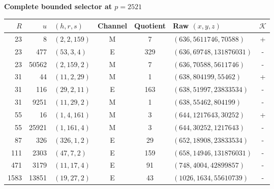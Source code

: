 \documentclass[11pt]{article}
\theoremstyle{remark}\newtheorem{remark}[theorem]{Remark}
\begin{document}
\begin{center}
\begin{minipage}{\textwidth}
\centering\small
\textbf{Complete bounded selector at $p=2521$}\\[4pt]
\begin{tabular}{@{}rrlcclc@{}}
\toprule
$R$&$u$&$(h,r,s)$&Channel&Quotient&Raw $(x,y,z)$&$\mathcal K$\\
\midrule
23&8&$(2,2,159)$&M&7&$(636,5611746,70588)$&+\\
23&477&$(53,3,4)$&E&329&$(636,69748,131876031)$&-\\
23&50562&$(2,159,2)$&M&7&$(636,70588,5611746)$&-\\
31&44&$(11,2,29)$&M&1&$(638,804199,55462)$&+\\
31&116&$(29,2,11)$&E&163&$(638,51997,23833534)$&-\\
31&9251&$(11,29,2)$&M&1&$(638,55462,804199)$&-\\
55&16&$(1,4,161)$&M&3&$(644,1217643,30252)$&+\\
55&25921&$(1,161,4)$&M&3&$(644,30252,1217643)$&-\\
87&326&$(326,1,2)$&E&29&$(652,18908,23833534)$&-\\
111&2303&$(47,7,2)$&E&159&$(658,14946,131876031)$&-\\
471&3179&$(11,17,4)$&E&91&$(748,4004,42899857)$&-\\
1583&13851&$(19,27,2)$&E&43&$(1026,1634,55610739)$&-\\
\bottomrule
\end{tabular}
\end{minipage}
\end{center}
\end{document}
